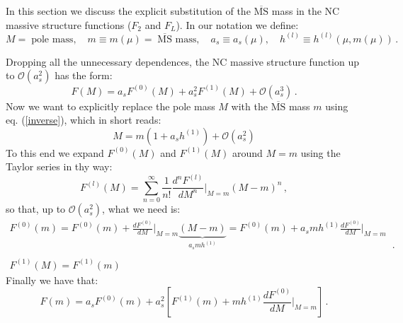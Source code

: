 \documentclass[10pt,a4paper]{article}
\begin{document}
In this section we discuss the explicit substitution of the $\overline{\mbox{MS}}$ mass in the NC massive structure functions ($F_2$ and $F_L$). In our notation we define:
\begin{equation}
M =\;\mbox{pole mass},\quad m\equiv m(\mu) =\;\overline{\mbox{MS}}\mbox{ mass},\quad a_s\equiv a_s(\mu),\quad h^{(l)}\equiv h^{(l)}(\mu,m(\mu))\,.
\end{equation}

Dropping all the unnecessary dependences, the NC massive structure function up to $\mathcal{O}(a_s^2)$ has the form:
\begin{equation}
F(M) = a_sF^{(0)}(M) + a_s^2F^{(1)}(M) + \mathcal{O}(a_s^3)\,.
\end{equation}
Now we want to explicitly replace the pole mass $M$ with the $\overline{\mbox{MS}}$ mass $m$ using eq. (\ref{inverse}), which in short reads:
\begin{equation}
M = m(1 + a_sh^{(1)}) + \mathcal{O}(a_s^2)
\end{equation}
To this end we expand $F^{(0)}(M)$ and $F^{(1)}(M)$ around $M=m$ using the Taylor series in thy way:
\begin{equation}
F^{(l)}(M) = \sum_{n=0}^{\infty}\frac1{n!}\frac{d^n F^{(l)}}{dM^n}\bigg|_{M=m}(M-m)^n\,,
\end{equation}
so that, up to $\mathcal{O}(a_s^2)$, what we need is:
\begin{equation}
\begin{array}{l}
\displaystyle F^{(0)}(m) = F^{(0)}(m) + \frac{dF^{(0)}}{dM}\bigg|_{M=m}\underbrace{(M-m)}_{a_smh^{(1)}} = F^{(0)}(m) + a_smh^{(1)}\frac{dF^{(0)}}{dM}\bigg|_{M=m}\\
\\
\displaystyle F^{(1)}(M) = F^{(1)}(m)
\end{array}\,.
\end{equation}
Finally we have that:
\begin{equation}
F(m) = a_sF^{(0)}(m) +
a_s^2\left[F^{(1)}(m)+mh^{(1)}\frac{dF^{(0)}}{dM}\bigg|_{M=m}\right]\,.
\label{changescheme}
\end{equation}
\end{document}

